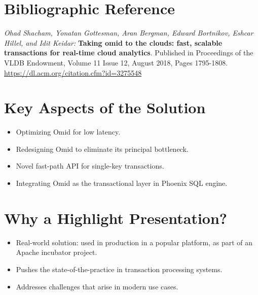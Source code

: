 \documentclass[sigconf,10pt, nonacm]{acmart}
\begin{document}
\section{Bibliographic Reference} 



\emph{
Ohad Shacham, Yonatan Gottesman, Aran Bergman, 
Edward Bortnikov, Eshcar Hillel, and Idit Keidar:}
{\bf Taking omid to the clouds: fast, scalable transactions for real-time cloud analytics}. 
Published in 
Proceedings of the VLDB Endowment,  
Volume 11 Issue 12, August 2018, Pages 1795-1808. 
\noindent
\url{https://dl.acm.org/citation.cfm?id=3275548}

\newpage

\section{Key Aspects of the Solution}

\begin{itemize}
\item 
Optimizing Omid for low latency.
\item 
Redesigning Omid to eliminate its principal bottleneck.
\item
Novel fast-path API for single-key transactions.
\item
Integrating Omid as the transactional layer in Phoenix SQL engine.
\end{itemize} 

\section{Why a Highlight Presentation?}


\begin{itemize}
\item 
Real-world solution: used in production in a popular platform, as part of an Apache incubator project. 
\item 
Pushes the state-of-the-practice in transaction processing systems. 
\item
Addresses challenges that arise in modern use cases. 
\end{itemize} 
\end{document}
